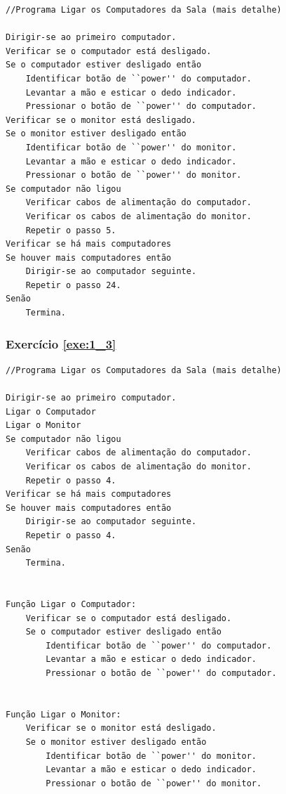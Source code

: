 \begin{lstlisting}
//Programa Ligar os Computadores da Sala (mais detalhe)

Dirigir-se ao primeiro computador.
Verificar se o computador está desligado.
Se o computador estiver desligado então
	Identificar botão de ``power'' do computador.
	Levantar a mão e esticar o dedo indicador.
	Pressionar o botão de ``power'' do computador.
Verificar se o monitor está desligado.
Se o monitor estiver desligado então
	Identificar botão de ``power'' do monitor.
	Levantar a mão e esticar o dedo indicador.
	Pressionar o botão de ``power'' do monitor.
Se computador não ligou
	Verificar cabos de alimentação do computador.
	Verificar os cabos de alimentação do monitor.
	Repetir o passo 5.
Verificar se há mais computadores     
Se houver mais computadores então
	Dirigir-se ao computador seguinte.
	Repetir o passo 24.
Senão
	Termina.    
\end{lstlisting}

\subsubsection*{Exercício \ref{exe:1_3}}
\begin{lstlisting}
//Programa Ligar os Computadores da Sala (mais detalhe)

Dirigir-se ao primeiro computador.
Ligar o Computador
Ligar o Monitor
Se computador não ligou
	Verificar cabos de alimentação do computador.
	Verificar os cabos de alimentação do monitor.
	Repetir o passo 4.
Verificar se há mais computadores     
Se houver mais computadores então
	Dirigir-se ao computador seguinte.
	Repetir o passo 4.
Senão
	Termina.
    
    
Função Ligar o Computador:
	Verificar se o computador está desligado.
	Se o computador estiver desligado então
		Identificar botão de ``power'' do computador.
		Levantar a mão e esticar o dedo indicador.
		Pressionar o botão de ``power'' do computador.


Função Ligar o Monitor:
	Verificar se o monitor está desligado.
	Se o monitor estiver desligado então
		Identificar botão de ``power'' do monitor.
		Levantar a mão e esticar o dedo indicador.
		Pressionar o botão de ``power'' do monitor.
\end{lstlisting}
